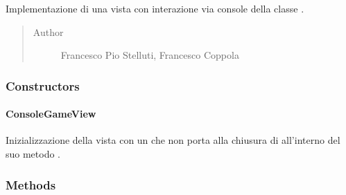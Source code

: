 \documentclass[letterpaper,10pt,italian,openany,oneside]{sphinxmanual}
\begin{document}
\begin{fulllineitems}
\label{\detokenize{test/it/unicam/cs/pa/mastermind/ui/ConsoleGameView:it.unicam.cs.pa.mastermind.ui.ConsoleGameView}}
Implementazione di una vista con interazione via console della classe .
\begin{quote}\begin{description}
\item[{Author}] \leavevmode
Francesco Pio Stelluti, Francesco Coppola

\end{description}\end{quote}

\end{fulllineitems}



\subsubsection{Constructors}
\label{\detokenize{test/it/unicam/cs/pa/mastermind/ui/ConsoleGameView:constructors}}

\paragraph{ConsoleGameView}
\label{\detokenize{test/it/unicam/cs/pa/mastermind/ui/ConsoleGameView:id1}}

\begin{fulllineitems}
\label{\detokenize{test/it/unicam/cs/pa/mastermind/ui/ConsoleGameView:it.unicam.cs.pa.mastermind.ui.ConsoleGameView.ConsoleGameView()}}
Inizializzazione della vista con un  che non porta alla chiusura di  all’interno del suo metodo .

\end{fulllineitems}



\subsubsection{Methods}
\label{\detokenize{test/it/unicam/cs/pa/mastermind/ui/ConsoleGameView:methods}}
\end{document}

